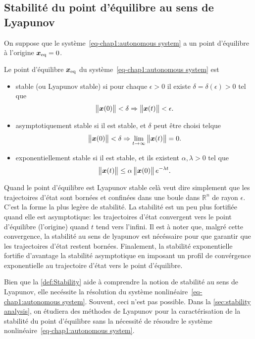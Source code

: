 \subsection{Stabilité du point d'équilibre au sens de Lyapunov}
On suppose que le système~\eqref{eq-chap1:autonomous system} a un point d'équilibre à l'origine $\bm{x}_{\rm eq}=0$.
\begin{definition}\label{def:Stability}\cite[Définition~4.1]{khalil2002NonLinearSystems}
	Le point d'équilibre $\bm{x}_{\rm eq}$ du système~\eqref{eq-chap1:autonomous system} est 
	\begin{itemize}
		\item stable (ou Lyapunov stable) si pour chaque $\epsilon>0$ il existe $\delta=\delta(\epsilon)>0$ tel que
		\begin{equation}\label{eq-chap1:lyapunov stable}
			\begin{Vmatrix} \bm{x}(0) \end{Vmatrix}<\delta\Rightarrow\begin{Vmatrix} \bm{x}(t) \end{Vmatrix}<\epsilon.
		\end{equation}
		\item asymptotiquement stable si il est stable, et $\delta$ peut être choisi telque 
		\begin{equation}\label{eq-chap1:asymptotic stable}
			\begin{Vmatrix} \bm{x}(0) \end{Vmatrix}<\delta\Rightarrow\underset{t\rightarrow\infty}{\lim}\begin{Vmatrix} \bm{x}(t) \end{Vmatrix}=0.
		\end{equation}
		\item exponentiellement stable si il est stable, et ils existent $\alpha,\lambda>0$ tel que
		\begin{equation}\label{eq-chap1:exp stable}
			\begin{Vmatrix} \bm{x}(t) \end{Vmatrix}\leq\alpha\begin{Vmatrix} \bm{x}(0) \end{Vmatrix}e^{-\lambda t}.
		\end{equation}
	\end{itemize}
\end{definition}
Quand le point d'équilibre est Lyapunov stable celà veut dire simplement que les trajectoires d'état sont bornées et confinées dans une boule dans $\mathbb{R}^n$ de rayon $\epsilon$. C'est la forme la plus legère de stabilité. La stabilité est un peu plus fortifiée quand elle est asymptotique:  les trajectoires d'état convergent vers le point d'équilibre (l'origine) quand $t$ tend vers l'infini. Il est à noter que, malgré cette convergence, la stabilité au sens de lyapunov est nécéssaire pour que garantir que les trajectoires d'état restent bornées. Finalement, la stabilité exponentielle fortifie d'avantage la stabilité asymptotique en imposant un profil de convérgence exponentielle au trajectoire d'état vers le point d'équilibre.

Bien que la \cref{def:Stability} aide à comprendre la notion de stabilité au sens de Lyapunov, elle necéssite la résolution du système nonlinéaire~\eqref{eq-chap1:autonomous system}. Souvent, ceci n'est pas possible. Dans la \cref{sec:stability analysis}, on étudiera des méthodes de Lyapunov pour la caractérisation de la stabilité du point d'équilibre sans la nécessité de résoudre le système nonlinéaire~\eqref{eq-chap1:autonomous system}. 
